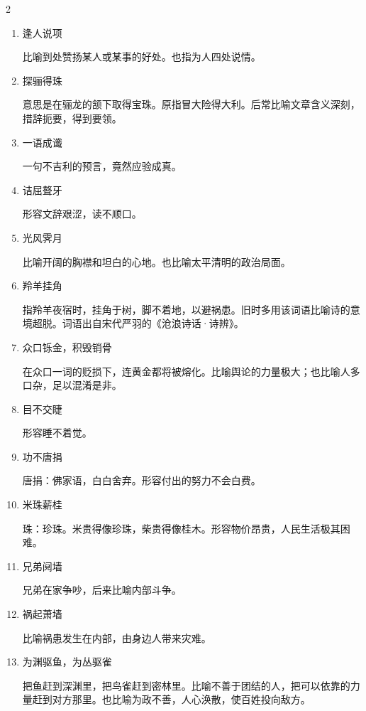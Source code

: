 \documentclass[final,oneside]{ctexbook}
\begin{document}
\begin{multicols}{2}
\begin{enumerate}
    \item 逢人说项

      比喻到处赞扬某人或某事的好处。也指为人四处说情。

    \item 探骊得珠

      意思是在骊龙的颔下取得宝珠。原指冒大险得大利。后常比喻文章含义深刻，措辞扼要，得到要领。

    \item 一语成谶

      一句不吉利的预言，竟然应验成真。

    \item 诘屈聱牙

      形容文辞艰涩，读不顺口。

    \item 光风霁月

      比喻开阔的胸襟和坦白的心地。也比喻太平清明的政治局面。

    \item 羚羊挂角

      指羚羊夜宿时，挂角于树，脚不着地，以避祸患。旧时多用该词语比喻诗的意境超脱。词语出自宋代严羽的《沧浪诗话·诗辨》。

    \item 众口铄金，积毁销骨

      在众口一词的贬损下，连黄金都将被熔化。比喻舆论的力量极大；也比喻人多口杂，足以混淆是非。

    \item 目不交睫

      形容睡不着觉。

    \item 功不唐捐

      唐捐：佛家语，白白舍弃。形容付出的努力不会白费。

    \item 米珠薪桂

      珠：珍珠。米贵得像珍珠，柴贵得像桂木。形容物价昂贵，人民生活极其困难。

    \item 兄弟阋墙

      兄弟在家争吵，后来比喻内部斗争。

    \item 祸起萧墙

      比喻祸患发生在内部，由身边人带来灾难。

    \item 为渊驱鱼，为丛驱雀

      把鱼赶到深渊里，把鸟雀赶到密林里。比喻不善于团结的人，把可以依靠的力量赶到对方那里。也比喻为政不善，人心涣散，使百姓投向敌方。


\end{enumerate}
\end{multicols}
\end{document}
